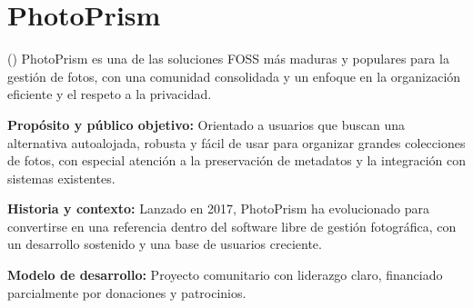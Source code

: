 
\section{PhotoPrism}

(\cite{photoprism-documentation}) PhotoPrism es una de las soluciones FOSS más maduras y populares para la gestión de fotos, con una comunidad consolidada y un enfoque en la organización eficiente y el respeto a la privacidad.

\textbf{Propósito y público objetivo:} Orientado a usuarios que buscan una alternativa autoalojada, robusta y fácil de usar para organizar grandes colecciones de fotos, con especial atención a la preservación de metadatos y la integración con sistemas existentes.

\textbf{Historia y contexto:} Lanzado en 2017, PhotoPrism ha evolucionado para convertirse en una referencia dentro del software libre de gestión fotográfica, con un desarrollo sostenido y una base de usuarios creciente.

\textbf{Modelo de desarrollo:} Proyecto comunitario con liderazgo claro, financiado parcialmente por donaciones y patrocinios.

